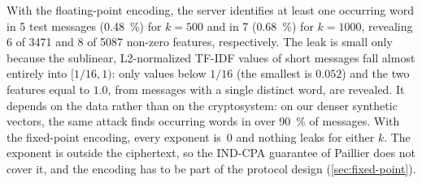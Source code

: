 With the floating-point encoding, the server identifies at least one occurring word in 5 test messages (\SI{0.48}{\percent}) for $k = 500$ and in 7 (\SI{0.68}{\percent}) for $k = 1000$, revealing 6 of \num{3471} and 8 of \num{5087} non-zero features, respectively.
The leak is small only because the sublinear, L2-normalized TF-IDF values of short messages fall almost entirely into $[1/16, 1)$: only values below $1/16$ (the smallest is $0.052$) and the two features equal to $1.0$, from messages with a single distinct word, are revealed.
It depends on the data rather than on the cryptosystem: on our denser synthetic vectors, the same attack finds occurring words in over \SI{90}{\percent} of messages.
With the fixed-point encoding, every exponent is~0 and nothing leaks for either $k$.
The exponent is outside the ciphertext, so the IND-CPA guarantee of Paillier does not cover it, and the encoding has to be part of the protocol design (\cref{sec:fixed-point}).
